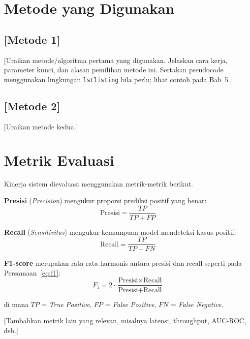 \section{Metode yang Digunakan}
\label{sec:3.3}

\subsection{[Metode 1]}
\label{sec:3.3.1}

[Uraikan metode/algoritma pertama yang digunakan. Jelaskan cara kerja, parameter kunci,
dan alasan pemilihan metode ini. Sertakan pseudocode menggunakan lingkungan
\texttt{lstlisting} bila perlu; lihat contoh pada Bab~5.]

\subsection{[Metode 2]}
\label{sec:3.3.2}

[Uraikan metode kedua.]

\section{Metrik Evaluasi}
\label{sec:3.4}

Kinerja sistem dievaluasi menggunakan metrik-metrik berikut.

\textbf{Presisi} (\emph{Precision}) mengukur proporsi prediksi positif yang benar:
\begin{equation}
  \text{Presisi} = \frac{TP}{TP + FP}
  \label{eq:presisi}
\end{equation}

\textbf{Recall} (\emph{Sensitivitas}) mengukur kemampuan model mendeteksi kasus positif:
\begin{equation}
  \text{Recall} = \frac{TP}{TP + FN}
  \label{eq:recall}
\end{equation}

\textbf{F1-score} merupakan rata-rata harmonis antara presisi dan recall seperti pada
Persamaan~\eqref{eq:f1}:
\begin{equation}
  F_1 = 2 \cdot \frac{\text{Presisi} \times \text{Recall}}{\text{Presisi} + \text{Recall}}
  \label{eq:f1}
\end{equation}

\noindent
di mana $TP$ = \emph{True Positive}, $FP$ = \emph{False Positive}, $FN$ = \emph{False Negative}.

[Tambahkan metrik lain yang relevan, misalnya latensi, throughput, AUC-ROC, dsb.]

